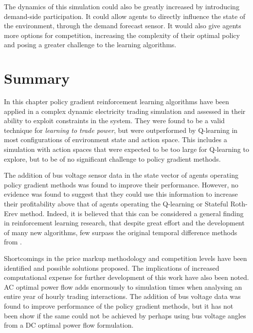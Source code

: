 The dynamics of this simulation could also be greatly increased by introducing
demand-side participation.  It could allow agents to directly influence the
state of the environment, through the demand forecast sensor.  It would
also give agents more options for competition, increasing the complexity of
their optimal policy and posing a greater challenge to the learning algorithms.

\section{Summary}
In this chapter policy gradient reinforcement learning algorithms have been
applied in a complex dynamic electricity trading simulation and assessed in
their ability to exploit constraints in the system.  They were found to be a
valid technique for \textit{learning to trade power}, but were outperformed by
Q-learning in most configurations of environment state and action space.  This
includes a simulation with action spaces that were expected to be too large for
Q-learning to explore, but to be of no significant challenge to policy gradient
methods.

The addition of bus voltage sensor data in the state vector of agents operating
policy gradient methods was found to improve their performance. However, no
evidence was found to suggest that they could use this information to increase
their profitability above that of agents operating the Q-learning or Stateful
Roth-Erev method.  Indeed, it is believed that this can be considered a general
finding in reinforcement learning research, that despite great effort and the
development of many new algorithms, few surpass the original temporal
difference methods from .

Shortcomings in the price markup methodology and competition levels have been
identified and possible solutions proposed.  The implications of increased
computational expense for further development of this work have also been noted.
AC optimal power flow adds enormously to simulation times when analysing an
entire year of hourly trading interactions.  The addition of bus voltage data
was found to improve performance of the policy gradient methods, but it has not
been show if the same could not be achieved by perhaps using bus voltage angles
from a DC optimal power flow formulation.
